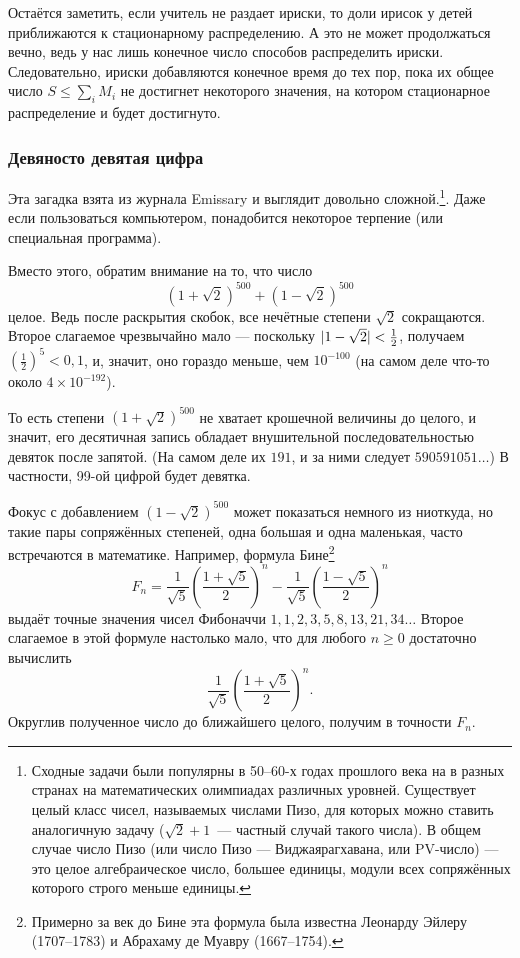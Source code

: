 Остаётся заметить, если учитель не раздает ириски, то доли ирисок у детей приближаются к стационарному распределению.
А это не может продолжаться вечно, ведь у нас лишь конечное число способов распределить ириски.
Следовательно, ириски добавляются конечное время до тех пор, пока их общее число $S\leqslant\sum_iM_i$ не достигнет некоторого значения, на котором стационарное распределение и будет достигнуто.

\subsubsection*{Девяносто девятая цифра}

Эта загадка взята из журнала Emissary \cite[осень 1999]{3} и выглядит довольно сложной.\footnote{Сходные задачи были популярны в 50--60-х годах прошлого века на  в разных странах на математических олимпиадах различных уровней. Существует целый класс чисел, называемых числами Пизо, для которых можно ставить аналогичную задачу ($\sqrt{2}+1$~--- частный случай такого числа). В общем случае число Пизо (или число Пизо --- Виджаярагхавана, или PV-число) --- это  целое алгебраическое число, большее единицы, модули всех сопряжённых которого строго меньше единицы.\pr}.
Даже если пользоваться компьютером, понадобится некоторое терпение (или специальная программа).

Вместо этого, обратим внимание на то, что число
\[(1+\sqrt{2})^{500}+(1-\sqrt{2})^{500}\]
целое.
Ведь после раскрытия скобок, все нечётные степени $\sqrt{2}$ сокращаются.
Второе слагаемое чрезвычайно мало --- поскольку $|1-\sqrt{2}|\z<\tfrac12$, получаем $(\tfrac12)^5<0{,}1$, и, значит, оно гораздо меньше, чем $10^{-100}$ (на самом деле что-то около $4 \times 10^{-192}$).

То есть степени $(1+\sqrt{2})^{500}$ не хватает крошечной величины до целого, и значит, его десятичная запись обладает внушительной последовательностью девяток после запятой.
(На самом деле их $191$, и за ними следует $590591051\dots$)
В частности, 99-ой цифрой будет девятка.

Фокус с добавлением $(1-\sqrt{2})^{500}$ может показаться немного из ниоткуда, но такие пары сопряжённых степеней, одна большая и одна маленькая, часто встречаются в математике.
Например, формула Бине\footnote{Примерно за век до Бине эта формула была известна Леонарду Эйлеру (1707--1783) и Абрахаму де Муавру (1667--1754).}
\[F_n=\frac{1}{\sqrt{5}}\left(\frac{1+\sqrt{5}}2\right)^n-\frac{1}{\sqrt{5}}\left(\frac{1-\sqrt{5}}2\right)^n\]
выдаёт точные значения чисел Фибоначчи $1, 1, 2, 3, 5, 8, 13, 21, 34 \dots$
Второе слагаемое в этой формуле настолько мало, что для любого $n \ge 0$ достаточно вычислить
\[\frac{1}{\sqrt{5}}\left(\frac{1+\sqrt{5}}2\right)^n.\]
Округлив полученное число до ближайшего целого, получим в точности $F_n$.

